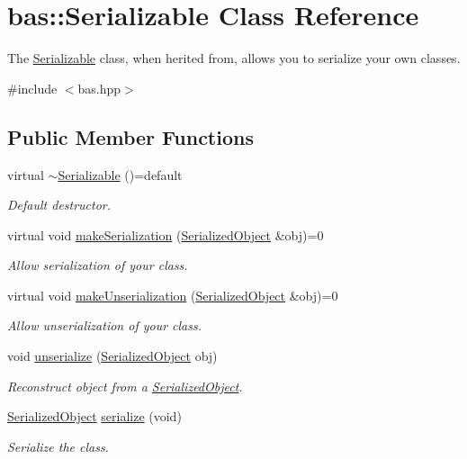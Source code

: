 \hypertarget{classbas_1_1Serializable}{}\section{bas\+::Serializable Class Reference}
\label{classbas_1_1Serializable}


The \mbox{\hyperlink{classbas_1_1Serializable}{Serializable}} class, when herited from, allows you to serialize your own classes.  




{\ttfamily \#include $<$bas.\+hpp$>$}

\subsection*{Public Member Functions}
\begin{DoxyCompactItemize}
\item 
virtual \mbox{\hyperlink{classbas_1_1Serializable_ab604b55953376e9022d28988c698986e}{$\sim$\+Serializable}} ()=default
\begin{DoxyCompactList}\small\item\em Default destructor. \end{DoxyCompactList}\item 
virtual void \mbox{\hyperlink{classbas_1_1Serializable_a013fd7c7acd4979418a7d30651a4b135}{make\+Serialization}} (\mbox{\hyperlink{classbas_1_1SerializedObject}{Serialized\+Object}} \&obj)=0
\begin{DoxyCompactList}\small\item\em Allow serialization of your class. \end{DoxyCompactList}\item 
virtual void \mbox{\hyperlink{classbas_1_1Serializable_af46002b3532fb719fa47e1d7cc731dd2}{make\+Unserialization}} (\mbox{\hyperlink{classbas_1_1SerializedObject}{Serialized\+Object}} \&obj)=0
\begin{DoxyCompactList}\small\item\em Allow unserialization of your class. \end{DoxyCompactList}\item 
void \mbox{\hyperlink{classbas_1_1Serializable_abd7e38e7a1e5a14b5614ee1c8b4612e0}{unserialize}} (\mbox{\hyperlink{classbas_1_1SerializedObject}{Serialized\+Object}} obj)
\begin{DoxyCompactList}\small\item\em Reconstruct object from a \mbox{\hyperlink{classbas_1_1SerializedObject}{Serialized\+Object}}. \end{DoxyCompactList}\item 
\mbox{\hyperlink{classbas_1_1SerializedObject}{Serialized\+Object}} \mbox{\hyperlink{classbas_1_1Serializable_a8b05e1e79cc281aa687c12b5786c2af3}{serialize}} (void)
\begin{DoxyCompactList}\small\item\em Serialize the class. \end{DoxyCompactList}\end{DoxyCompactItemize}


